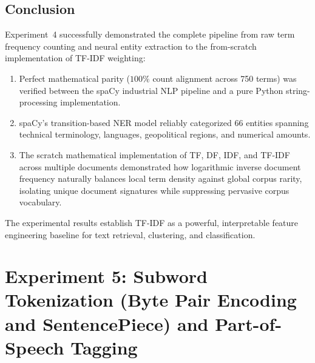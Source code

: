 \documentclass[12pt,a4paper]{report}
\begin{document}
\section{Conclusion}
Experiment~4 successfully demonstrated the complete pipeline from raw term frequency counting and neural entity extraction to the from-scratch implementation of TF-IDF weighting:
\begin{enumerate}
    \item Perfect mathematical parity ($100\%$ count alignment across 750 terms) was verified between the spaCy industrial NLP pipeline and a pure Python string-processing implementation.
    \item spaCy's transition-based NER model reliably categorized 66 entities spanning technical terminology, languages, geopolitical regions, and numerical amounts.
    \item The scratch mathematical implementation of TF, DF, IDF, and TF-IDF across multiple documents demonstrated how logarithmic inverse document frequency naturally balances local term density against global corpus rarity, isolating unique document signatures while suppressing pervasive corpus vocabulary.
\end{enumerate}
The experimental results establish TF-IDF as a powerful, interpretable feature engineering baseline for text retrieval, clustering, and classification.



\chapter{Experiment 5: Subword Tokenization (Byte Pair Encoding and SentencePiece) and Part-of-Speech Tagging}
\label{chap:exp5}
\end{document}
